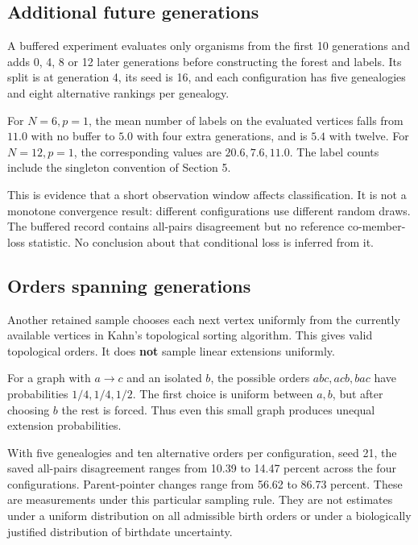 \documentclass[
  11pt,
  letterpaper,
]{article}
\begin{document}
\subsection{Additional future
generations}\label{additional-future-generations}

A buffered experiment evaluates only organisms from the first 10
generations and adds 0, 4, 8 or 12 later generations before constructing
the forest and labels. Its split is at generation 4, its seed is 16, and
each configuration has five genealogies and eight alternative rankings
per genealogy.

For \(N=6,p=1\), the mean number of labels on the evaluated vertices
falls from \(11.0\) with no buffer to \(5.0\) with four extra
generations, and is \(5.4\) with twelve. For \(N=12,p=1\), the
corresponding values are \(20.6,7.6,11.0\). The label counts include the
singleton convention of Section 5.

This is evidence that a short observation window affects classification.
It is not a monotone convergence result: different configurations use
different random draws. The buffered record contains all-pairs
disagreement but no reference co-member-loss statistic. No conclusion
about that conditional loss is inferred from it.

\subsection{Orders spanning
generations}\label{orders-spanning-generations}

Another retained sample chooses each next vertex uniformly from the
currently available vertices in Kahn's topological sorting algorithm.
This gives valid topological orders. It does \textbf{not} sample linear
extensions uniformly.

For a graph with \(a\to c\) and an isolated \(b\), the possible orders
\(abc,acb,bac\) have probabilities \(1/4,1/4,1/2\). The first choice is
uniform between \(a,b\), but after choosing \(b\) the rest is forced.
Thus even this small graph produces unequal extension probabilities.

With five genealogies and ten alternative orders per configuration, seed
21, the saved all-pairs disagreement ranges from 10.39 to 14.47 percent
across the four configurations. Parent-pointer changes range from 56.62
to 86.73 percent. These are measurements under this particular sampling
rule. They are not estimates under a uniform distribution on all
admissible birth orders or under a biologically justified distribution
of birthdate uncertainty.
\end{document}
